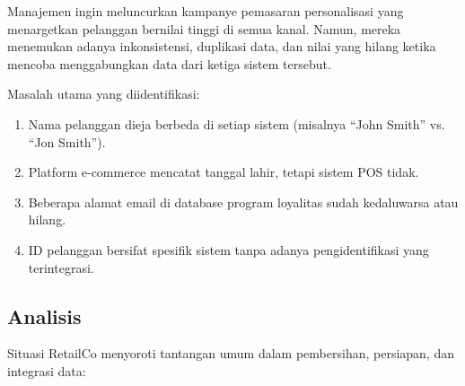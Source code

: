 Manajemen ingin meluncurkan kampanye pemasaran personalisasi yang menargetkan pelanggan bernilai tinggi di semua kanal. Namun, mereka menemukan adanya inkonsistensi, duplikasi data, dan nilai yang hilang ketika mencoba menggabungkan data dari ketiga sistem tersebut.

Masalah utama yang diidentifikasi:

\begin{enumerate}
	\item Nama pelanggan dieja berbeda di setiap sistem (misalnya “John Smith” vs. “Jon Smith”).
	\item Platform e-commerce mencatat tanggal lahir, tetapi sistem POS tidak.
	\item Beberapa alamat email di database program loyalitas sudah kedaluwarsa atau hilang.
	\item ID pelanggan bersifat spesifik sistem tanpa adanya pengidentifikasi yang terintegrasi.
\end{enumerate}

\subsection{Analisis}

Situasi RetailCo menyoroti tantangan umum dalam pembersihan, persiapan, dan integrasi data:

